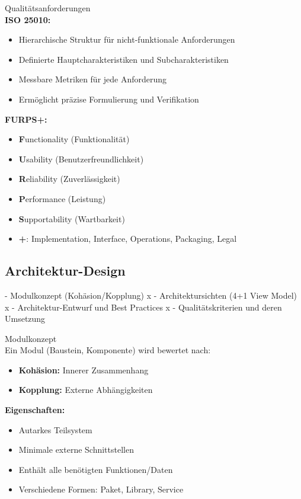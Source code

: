 \begin{theorem}{Qualitätsanforderungen}\\
\textbf{ISO 25010:}
\begin{itemize}
    \item Hierarchische Struktur für nicht-funktionale Anforderungen
    \item Definierte Hauptcharakteristiken und Subcharakteristiken
    \item Messbare Metriken für jede Anforderung
    \item Ermöglicht präzise Formulierung und Verifikation
\end{itemize}

\textbf{FURPS+:}
\begin{itemize}
    \item \textbf{F}unctionality (Funktionalität)
    \item \textbf{U}sability (Benutzerfreundlichkeit)
    \item \textbf{R}eliability (Zuverlässigkeit)
    \item \textbf{P}erformance (Leistung)
    \item \textbf{S}upportability (Wartbarkeit)
    \item \textbf{+}: Implementation, Interface, Operations, Packaging, Legal
\end{itemize}
\end{theorem}

\subsection{Architektur-Design}
- Modulkonzept (Kohäsion/Kopplung) x
- Architektursichten (4+1 View Model) x
- Architektur-Entwurf und Best Practices x
- Qualitätskriterien und deren Umsetzung

\begin{concept}{Modulkonzept}\\
Ein Modul (Baustein, Komponente) wird bewertet nach:
\begin{itemize}
    \item \textbf{Kohäsion:} Innerer Zusammenhang
    \item \textbf{Kopplung:} Externe Abhängigkeiten
\end{itemize}

\textbf{Eigenschaften:}
\begin{itemize}
    \item Autarkes Teilsystem
    \item Minimale externe Schnittstellen
    \item Enthält alle benötigten Funktionen/Daten
    \item Verschiedene Formen: Paket, Library, Service
\end{itemize}
\end{concept}

